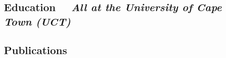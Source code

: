 \documentclass[10pt]{article}
\begin{document}


\subsection*{Education %
  ~~{\small \textmd{\textit{All at the University of Cape Town (UCT)}}}}



\bigskip

\subsection*{Publications} %



\hrulefill
\end{document}
